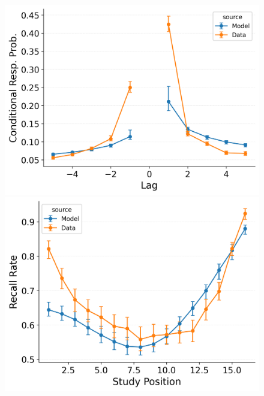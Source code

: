 \documentclass[
  man,
  floatsintext,
  longtable,
  nolmodern,
  notxfonts,
  notimes,
  draftfirst,
  colorlinks=true,linkcolor=blue,citecolor=blue,urlcolor=blue]{apa7}
\begin{document}
\begin{figure}
\begin{minipage}{0.33\linewidth}
\includegraphics{figures/HealeyKahana2014_CRU_with_Free_Start_Drift_rate_Fitting_crp.png}\end{minipage}%
%
\begin{minipage}{0.33\linewidth}
\includegraphics{figures/HealeyKahana2014_CRU_with_Free_Start_Drift_rate_Fitting_spc.png}\end{minipage}%
\newline
\begin{minipage}{0.33\linewidth}

\end{minipage}
\end{figure}
\end{document}
